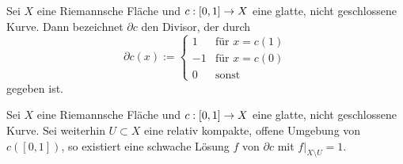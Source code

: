 \begin{defin}
  Sei $X$ eine Riemannsche Fläche und $c: [0,1] \rightarrow X$ eine glatte,
  nicht geschlossene Kurve. Dann bezeichnet $\partial c$ den Divisor,
  der durch
  \[
  \partial c(x) :=
  \begin{cases}
    1 & \text{für } x = c(1) \\
    -1 & \text{für } x = c(0) \\
    0 & \text{sonst}
  \end{cases}
  \]
  gegeben ist.
\end{defin}

\begin{lemma}
  \label{lemma:schw-lsg-kurve}
  Sei $X$ eine Riemannsche Fläche und $c: [0,1] \rightarrow X$ eine glatte,
  nicht geschlossene
  Kurve. Sei weiterhin $U \subset X$ eine relativ kompakte, offene
  Umgebung von $c([0,1])$, so existiert eine schwache Lösung $f$ von
  $\partial c$ mit $f|_{X \setminus U} = 1$.
\end{lemma}


